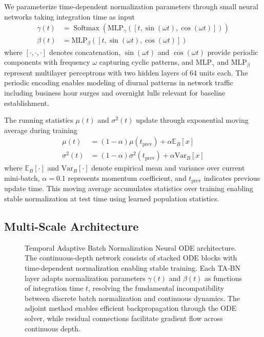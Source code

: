 \documentclass[10pt,journal,compsoc]{IEEEtran}
\newcommand{\Softmax}{\operatorname{Softmax}}
\begin{document}
We parameterize time-dependent normalization parameters through small neural networks taking integration time as input
\begin{align}
\gamma(t) &= \Softmax(\text{MLP}_\gamma([t, \sin(\omega t), \cos(\omega t)])) \\
\beta(t) &= \text{MLP}_\beta([t, \sin(\omega t), \cos(\omega t)])
\end{align}
where $[\cdot, \cdot, \cdot]$ denotes concatenation, $\sin(\omega t)$ and $\cos(\omega t)$ provide periodic components with frequency $\omega$ capturing cyclic patterns, and $\text{MLP}_\gamma$ and $\text{MLP}_\beta$ represent multilayer perceptrons with two hidden layers of 64 units each. The periodic encoding enables modeling of diurnal patterns in network traffic including business hour surges and overnight lulls relevant for baseline establishment.

The running statistics $\mu(t)$ and $\sigma^2(t)$ update through exponential moving average during training
\begin{align}
\mu(t) &= (1 - \alpha) \mu(t_{\text{prev}}) + \alpha \mathbb{E}_B[x] \\
\sigma^2(t) &= (1 - \alpha) \sigma^2(t_{\text{prev}}) + \alpha \text{Var}_B[x]
\end{align}
where $\mathbb{E}_B[\cdot]$ and $\text{Var}_B[\cdot]$ denote empirical mean and variance over current mini-batch, $\alpha = 0.1$ represents momentum coefficient, and $t_{\text{prev}}$ indicates previous update time. This moving average accumulates statistics over training enabling stable normalization at test time using learned population statistics.

\subsection{Multi-Scale Architecture}

\begin{figure}[!t]
\centering

\caption{Temporal Adaptive Batch Normalization Neural ODE architecture. The continuous-depth network consists of stacked ODE blocks with time-dependent normalization enabling stable training. Each TA-BN layer adapts normalization parameters $\gamma(t)$ and $\beta(t)$ as functions of integration time $t$, resolving the fundamental incompatibility between discrete batch normalization and continuous dynamics. The adjoint method enables efficient backpropagation through the ODE solver, while residual connections facilitate gradient flow across continuous depth.}
\label{fig:tabn_architecture}
\end{figure}
\end{document}
